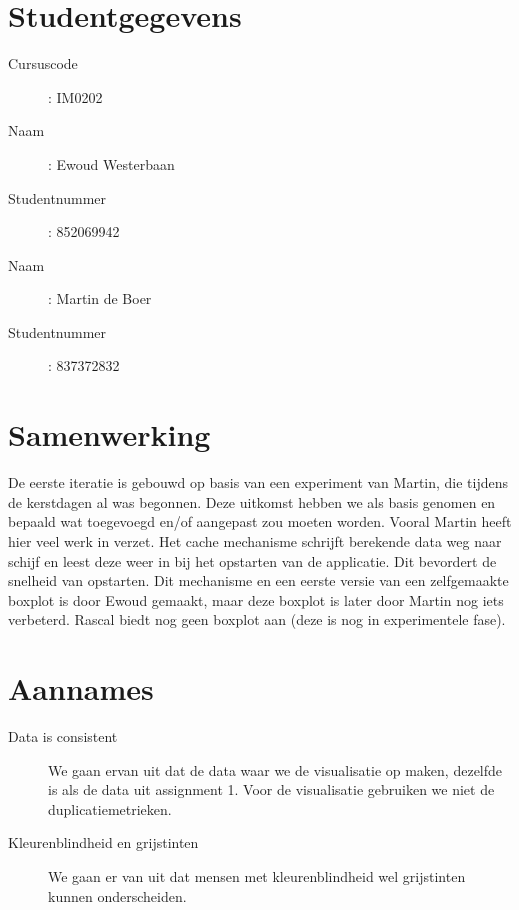 \documentclass[a4paper]{article}
\begin{document}
\pagestyle{fancy}

\section*{Studentgegevens}
\begin{description}
	\item [Cursuscode]: IM0202
	\item [Naam]: Ewoud Westerbaan
	\item [Studentnummer]: 852069942
	\item [Naam]: Martin de Boer
	\item [Studentnummer]: 837372832
\end{description}

\section{Samenwerking}
De eerste iteratie is gebouwd op basis van een experiment van Martin, die tijdens de kerstdagen al was begonnen. Deze uitkomst hebben we als basis genomen en bepaald wat toegevoegd en/of aangepast zou moeten worden. Vooral Martin heeft hier veel werk in verzet.
Het cache mechanisme schrijft berekende data weg naar schijf en leest deze weer in bij het opstarten van de applicatie. Dit bevordert de snelheid van opstarten. Dit mechanisme en een eerste versie van een zelfgemaakte boxplot is door Ewoud gemaakt, maar deze boxplot is later door Martin nog iets verbeterd. Rascal biedt nog geen boxplot aan (deze is nog in experimentele fase).


\section{Aannames}
\begin{description}
\item[Data is consistent] We gaan ervan uit dat de data waar we de visualisatie op maken, dezelfde is als de data uit assignment 1. Voor de visualisatie gebruiken we niet de duplicatiemetrieken.
\item[Kleurenblindheid en grijstinten] We gaan er van uit dat mensen met kleurenblindheid wel grijstinten kunnen onderscheiden.
\end{description}
\end{document}
